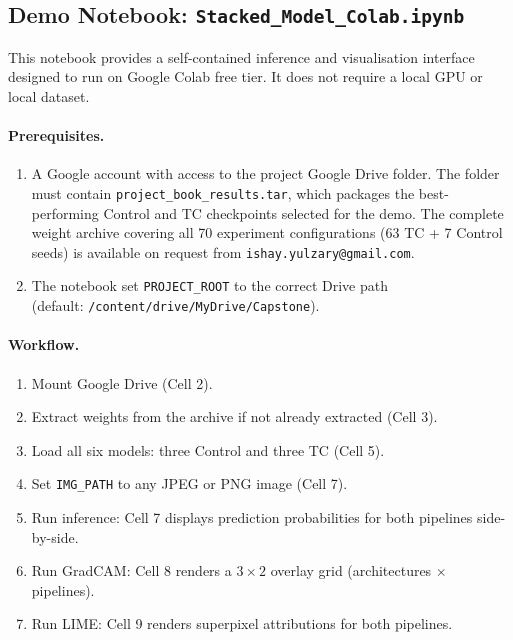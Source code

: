 \documentclass[12pt,a4paper]{article}
\begin{document}
\subsection{Demo Notebook: \texttt{Stacked\_Model\_Colab.ipynb}}
\label{sec:pg-demo}

This notebook provides a self-contained inference and visualisation interface
designed to run on Google Colab free tier. It does not require a local GPU or
local dataset.

\paragraph{Prerequisites.}
\begin{enumerate}
    \item A Google account with access to the project Google Drive folder.
          The folder must contain \texttt{project\_book\_results.tar},
          which packages the best-performing Control and TC checkpoints
          selected for the demo. The complete weight archive covering all
          70 experiment configurations (63 TC + 7 Control seeds) is
          available on request from \texttt{ishay.yulzary@gmail.com}.
    \item The notebook set \texttt{PROJECT\_ROOT} to the correct Drive path
          \\(default: \texttt{/content/drive/MyDrive/Capstone}).
\end{enumerate}

\paragraph{Workflow.}
\begin{enumerate}
    \item Mount Google Drive (Cell 2).
    \item Extract weights from the archive if not already extracted (Cell 3).
    \item Load all six models: three Control and three TC (Cell 5).
    \item Set \texttt{IMG\_PATH} to any JPEG or PNG image (Cell 7).
    \item Run inference: Cell 7 displays prediction probabilities for both
          pipelines side-by-side.
    \item Run GradCAM: Cell 8 renders a $3 \times 2$ overlay grid
          (architectures $\times$ pipelines).
    \item Run LIME: Cell 9 renders superpixel attributions for both pipelines.
\end{enumerate}
\end{document}
